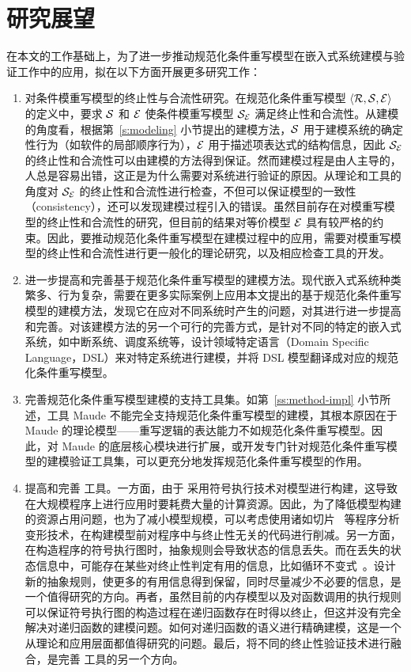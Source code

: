 \section{研究展望}

在本文的工作基础上，为了进一步推动规范化条件重写模型在嵌入式系统建模与验证工作中的应用，拟在以下方面开展更多研究工作：

\begin{enumerate}
\item 
对条件模重写模型的终止性与合流性研究。在规范化条件重写模型 $\langle \mathcal{R},\mathcal{S},\mathcal{E}\rangle$ 的定义中，要求 $\mathcal{S}$ 和 $\mathcal{E}$ 使条件模重写模型 $\mathcal{S}_{\mathcal{E}}$ 满足终止性和合流性。从建模的角度看，根据第~\ref{s:modeling} 小节提出的建模方法，$\mathcal{S}$ 用于建模系统的确定性行为（如软件的局部顺序行为），$\mathcal{E}$ 用于描述项表达式的结构信息，因此 $\mathcal{S}_{\mathcal{E}}$ 的终止性和合流性可以由建模的方法得到保证。然而建模过程是由人主导的，人总是容易出错，这正是为什么需要对系统进行验证的原因。从理论和工具的角度对 $\mathcal{S}_{\mathcal{E}}$ 的终止性和合流性进行检查，不但可以保证模型的一致性（consistency），还可以发现建模过程引入的错误。虽然目前存在对模重写模型的终止性和合流性的研究\cite{DBLP:conf/cade/JouannaudM84,DBLP:journals/tcs/JouannaudM92,DBLP:journals/ijsi/JouannaudT08,DBLP:conf/rta/Jouannaud06,DBLP:journals/tcs/JouannaudL12,DBLP:journals/siamcomp/JouannaudK86}，但目前的结果对等价模型 $\mathcal{E}$ 具有较严格的约束。因此，要推动规范化条件重写模型在建模过程中的应用，需要对模重写模型的终止性和合流性进行更一般化的理论研究，以及相应检查工具的开发。
\item
进一步提高和完善基于规范化条件重写模型的建模方法。现代嵌入式系统种类繁多、行为复杂，需要在更多实际案例上应用本文提出的基于规范化条件重写模型的建模方法，发现它在应对不同系统时产生的问题，对其进行进一步提高和完善。对该建模方法的另一个可行的完善方式，是针对不同的特定的嵌入式系统，如中断系统、调度系统等，设计领域特定语言（Domain Specific Language，DSL）来对特定系统进行建模，并将 DSL 模型翻译成对应的规范化条件重写模型。
\item 
完善规范化条件重写模型建模的支持工具集。如第~\ref{ss:method-impl} 小节所述，工具 Maude 不能完全支持规范化条件重写模型的建模，其根本原因在于 Maude 的理论模型——重写逻辑的表达能力不如规范化条件重写模型。因此，对 Maude 的底层核心模块进行扩展，或开发专门针对规范化条件重写模型的建模验证工具集，可以更充分地发挥规范化条件重写模型的作用。
\item 
提高和完善 \CTerm 工具。一方面，由于 \CTerm 采用符号执行技术对模型进行构建，这导致在大规模程序上进行应用时要耗费大量的计算资源。因此，为了降低模型构建的资源占用问题，也为了减小模型规模，可以考虑使用诸如切片~\cite{DBLP:journals/tse/Weiser84} 等程序分析变形技术，在构建模型前对程序中与终止性无关的代码进行削减。另一方面，在构造程序的符号执行图时，抽象规则会导致状态的信息丢失。而在丢失的状态信息中，可能存在某些对终止性判定有用的信息，比如循环不变式~\cite{DBLP:journals/cacm/Hoare69}。设计新的抽象规则，使更多的有用信息得到保留，同时尽量减少不必要的信息，是一个值得研究的方向。再者，虽然目前的内存模型以及对函数调用的执行规则可以保证符号执行图的构造过程在递归函数存在时得以终止，但这并没有完全解决对递归函数的建模问题。如何对递归函数的语义进行精确建模，这是一个从理论和应用层面都值得研究的问题。最后，将不同的终止性验证技术进行融合，是完善 \CTerm 工具的另一个方向。
\end{enumerate}